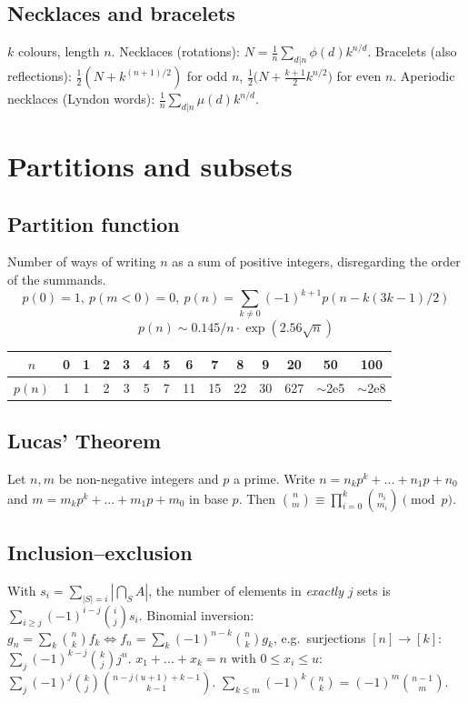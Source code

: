 	\subsection{Necklaces and bracelets}
	$k$ colours, length $n$. Necklaces (rotations): $N=\frac1n\sum_{d|n}\phi(d)k^{n/d}$. Bracelets (also reflections): $\frac12(N+k^{(n+1)/2})$ for odd $n$, $\frac12\big(N+\frac{k+1}2k^{n/2}\big)$ for even $n$. Aperiodic necklaces (Lyndon words): $\frac1n\sum_{d|n}\mu(d)k^{n/d}$.

\section{Partitions and subsets}
	\subsection{Partition function}
		Number of ways of writing $n$ as a sum of positive integers, disregarding the order of the summands.
		\[ p(0) = 1,\ p(m<0) = 0,\ p(n) = \sum_{k \ne 0} (-1)^{k+1} p(n - k(3k-1) / 2) \]
		\[ p(n) \sim 0.145 / n \cdot \exp(2.56 \sqrt{n}) \]

		\begin{center}
		\begin{tabular}{c|c@{\ }c@{\ }c@{\ }c@{\ }c@{\ }c@{\ }c@{\ }c@{\ }c@{\ }c@{\ }c@{\ }c@{\ }c}
			$n$    & 0 & 1 & 2 & 3 & 4 & 5 & 6  & 7  & 8  & 9  & 20  & 50  & 100 \\ \hline
			$p(n)$ & 1 & 1 & 2 & 3 & 5 & 7 & 11 & 15 & 22 & 30 & 627 & $\mathtt{\sim}$2e5 & $\mathtt{\sim}$2e8 \\
		\end{tabular}
		\end{center}

	\subsection{Lucas' Theorem}
		Let $n,m$ be non-negative integers and $p$ a prime. Write $n=n_kp^k+...+n_1p+n_0$ and $m=m_kp^k+...+m_1p+m_0$ in base $p$. Then $\binom{n}{m} \equiv \prod_{i=0}^k\binom{n_i}{m_i} \pmod{p}$.
	\subsection{Inclusion--exclusion}
	With $s_i=\sum_{|S|=i}|\bigcap_{S}A|$, the number of elements in \emph{exactly} $j$ sets is $\sum_{i\ge j}(-1)^{i-j}\binom ij s_i$.
	Binomial inversion: $g_n=\sum_k\binom nkf_k\iff f_n=\sum_k(-1)^{n-k}\binom nkg_k$, e.g.\ surjections $[n]\to[k]$: $\sum_j(-1)^{k-j}\binom kjj^n$.
	$x_1+\dots+x_k=n$ with $0\le x_i\le u$: $\sum_j(-1)^j\binom kj\binom{n-j(u+1)+k-1}{k-1}$.
	$\sum_{k\le m}(-1)^k\binom nk=(-1)^m\binom{n-1}m$.


